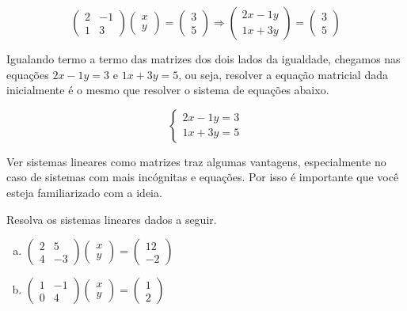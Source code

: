 \documentclass[main_estudante.tex]{subfiles}
\begin{document}
$$
\begin{pmatrix}2 & -1 \\ 1 & 3\end{pmatrix} \begin{pmatrix}x \\ y\end{pmatrix} = \begin{pmatrix}3 \\ 5\end{pmatrix} \Rightarrow \begin{pmatrix}2x-1y \\ 1x+3y\end{pmatrix} = \begin{pmatrix}3 \\ 5\end{pmatrix}
$$

Igualando termo a termo das matrizes dos dois lados da igualdade, chegamos nas equações $2x-1y=3$ e $1x+3y=5$, ou seja, resolver a equação matricial dada inicialmente é o mesmo que resolver o sistema de equações abaixo.

$$\begin{cases}2x-1y=3\\1x+3y=5\end{cases}$$

Ver sistemas lineares como matrizes traz algumas vantagens, especialmente no caso de sistemas com mais incógnitas e equações. Por isso é importante que você esteja familiarizado com a ideia.

\begin{questao}
Resolva os sistemas lineares dados a seguir.
\begin{enumerate}[a)]
\item $\begin{pmatrix}2 & 5 \\ 4 & -3\end{pmatrix} \begin{pmatrix}x \\ y\end{pmatrix} = \begin{pmatrix}12 \\ -2\end{pmatrix}$
\item $\begin{pmatrix}1 & -1 \\ 0 & 4\end{pmatrix} \begin{pmatrix}x \\ y\end{pmatrix} = \begin{pmatrix}1 \\ 2\end{pmatrix}$
\end{enumerate}
\end{questao}
\end{document}
